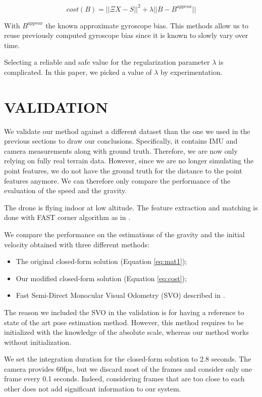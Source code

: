 \documentclass[letterpaper, 10 pt, conference]{ieeeconf}  %
\begin{document}
\[
cost(B) = ||\Xi X - S||^2 + \lambda ||B - B^{approx}||
\]

With $B^{approx}$ the known approximate gyroscope bias.
This methods allow us to reuse previously computed gyroscope bias since it is known to slowly vary over time.

Selecting a reliable and safe value for the regularization parameter $\lambda$ is complicated.
In this paper, we picked a value of $\lambda$ by experimentation.

\section{VALIDATION}\label{SectionPerformance}

We validate our method against a different dataset than the one we used in the previous sections to draw our conclusions.
Specifically, it contains IMU and camera measurements along with ground truth.
Therefore, we are now only relying on fully real terrain data.
However, since we are no longer simulating the point features, we do not have the ground truth for the distance to the point features anymore.
We can therefore only compare the performance of the evaluation of the speed and the gravity.

The drone is flying indoor at low altitude.
The feature extraction and matching is done with FAST corner algorithm as in \cite{Forster2014}.

We compare the performance on the estimations of the gravity and the initial velocity obtained with three different methods:
\begin{itemize}
\item The original closed-form solution (Equation \ref{eq:mat1});
\item Our modified closed-form solution (Equation \ref{eq:cost});
\item Fast Semi-Direct Monocular Visual Odometry (SVO) described in \cite{Forster2014}.
\end{itemize}
The reason we included the SVO in the validation is for having a reference to state of the art pose estimation method.
However, this method requires to be initialized with the knowledge of the absolute scale, whereas our method works without initialization.

We set the integration duration for the closed-form solution to 2.8 seconds.
The camera provides 60fps, but we discard most of the frames and consider only one frame every 0.1 seconds.
Indeed, considering frames that are too close to each other does not add significant information to our system.
\end{document}
